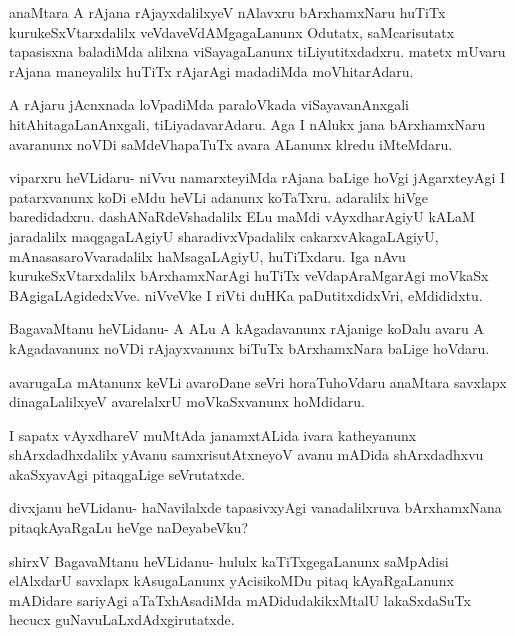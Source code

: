\documentclass{article}
\begin{document}
\begin{mng}%
anaMtara A rAjana rAjayxdalilxyeV nAlavxru bArxhamxNaru
huTiTx kurukeSxVtarxdalilx veVdaveVdAMgagaLanunx Odutatx, saMcarisutatx tapasisxna
baladiMda alilxna viSayagaLanunx tiLiyutitxdadxru. matetx mUvaru rAjana
maneyalilx huTiTx rAjarAgi madadiMda moVhitarAdaru.
\end{mng}

\begin{mng}%
A rAjaru jAcnxnada loVpadiMda paraloVkada viSayavanAnxgali
hitAhitagaLanAnxgali, tiLiyadavarAdaru. Aga I nAlukx jana bArxhamxNaru
avaranunx noVDi saMdeVhapaTuTx avara ALanunx klredu iMteMdaru.
\end{mng}

\begin{mng}%
viparxru heVLidaru- niVvu namarxteyiMda rAjana baLige
hoVgi jAgarxteyAgi I patarxvanunx koDi eMdu heVLi adanunx koTaTxru.
adaralilx hiVge baredidadxru. dashANaRdeVshadalilx ELu maMdi vAyxdharAgiyU kALaM
jaradalilx maqgagaLAgiyU sharadivxVpadalilx cakarxvAkagaLAgiyU, mAnasasaroVvaradalilx
haMsagaLAgiyU, huTiTxdaru. Iga nAvu kurukeSxVtarxdalilx bArxhamxNarAgi
huTiTx veVdapAraMgarAgi moVkaSx BAgigaLAgidedxVve. niVveVke I riVti duHKa
paDutitxdidxVri, eMdididxtu.
\end{mng}

\begin{mng}%
BagavaMtanu heVLidanu- A ALu A kAgadavanunx rAjanige
koDalu avaru A kAgadavanunx noVDi rAjayxvanunx biTuTx bArxhamxNara baLige
hoVdaru.
\end{mng}

\begin{mng}%
avarugaLa mAtanunx keVLi avaroDane seVri horaTuhoVdaru
anaMtara savxlapx dinagaLalilxyeV avarelalxrU moVkaSxvanunx hoMdidaru.
\end{mng}

\begin{mng}%
I sapatx vAyxdhareV muMtAda janamxtALida ivara katheyanunx
shArxdadhxdalilx yAvanu samxrisutAtxneyoV avanu mADida shArxdadhxvu akaSxyavAgi
pitaqgaLige seVrutatxde.
\end{mng}

\begin{mng}%
divxjanu heVLidanu- haNavilalxde tapasivxyAgi vanadalilxruva
bArxhamxNana pitaqkAyaRgaLu heVge naDeyabeVku?
\end{mng}

\begin{mng}%
shirxV BagavaMtanu heVLidanu- hululx kaTiTxgegaLanunx saMpAdisi
elAlxdarU savxlapx kAsugaLanunx yAcisikoMDu pitaq kAyaRgaLanunx mADidare
sariyAgi aTaTxhAsadiMda mADidudakikxMtalU lakaSxdaSuTx hecucx guNavuLaLxdAdxgirutatxde.
\end{mng}
\end{document}
